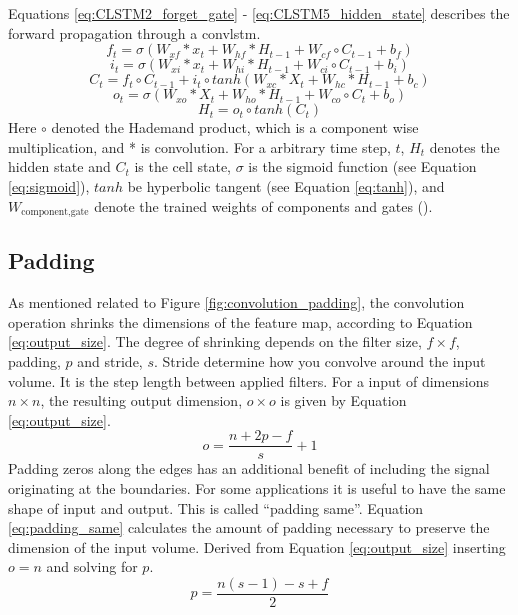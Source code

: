 Equations \eqref{eq:CLSTM2_forget_gate} - \eqref{eq:CLSTM5_hidden_state} describes the forward propagation through a \acrshort{convlstm}. 
\begin{equation} \label{eq:CLSTM2_forget_gate}
        f_t = \sigma \left( W_{xf}*x_t + W_{hf}*H_{t-1} + W_{cf}\circ C_{t-1}+b_f \right)
\end{equation}
\begin{equation} \label{eq:CLSTM1_input_gate}
    i_t = \sigma \left( W_{xi}*x_t + W_{hi}*H_{t-1} + W_{ci}\circ C_{t-1}+b_i \right) 
\end{equation}
\begin{equation} \label{eq:CLSTM3_cellstate}
        C_t = f_t \circ C_{t-1} +i_t\circ tanh\left( W_{xc}*X_t + W_{hc}*H_{t-1} + b_c \right)
\end{equation}
\begin{equation} \label{eq:CLSTM4_output_gate}
        o_t = \sigma \left( W_{xo}*X_t + W_{ho}*H_{t-1} + W_{co}\circ C_{t}+b_o \right)
\end{equation}
\begin{equation} \label{eq:CLSTM5_hidden_state}
        H_t = o_t \circ tanh \left( C_t \right)
\end{equation}
Here $\circ$ denoted the Hademand product, which is a component wise multiplication, and * is convolution. For a arbitrary time step, $t$, $H_{t}$ denotes the hidden state and $C_{t}$ is the cell state, $\sigma$ is the sigmoid function (see Equation \eqref{eq:sigmoid}), $tanh$ be hyperbolic tangent (see Equation \eqref{eq:tanh}), and $W_{\text{component}, \text{gate}}$ denote the trained weights of components and gates (\cite{precip_nowcasting}). 

\subsection{Padding} \label{sec:padding}
As mentioned related to Figure \ref{fig:convolution_padding}, the convolution operation shrinks the dimensions of the feature map, according to Equation \eqref{eq:output_size}. The degree of shrinking depends on the filter size, $f\times f$, padding, $p$ and stride, $s$. Stride determine how you convolve around the input volume. It is the step length between applied filters. For a input of dimensions $n\times n$, the resulting output dimension, $o\times o$ is given by Equation \eqref{eq:output_size}.
\begin{equation} \label{eq:output_size}
    o = \frac{n+2p-f}{s} + 1
\end{equation}
Padding zeros along the edges has an additional benefit of including the signal originating at the boundaries. For some applications it is useful to have the same shape of input and output. This is called ``padding same''. Equation \eqref{eq:padding_same} calculates the amount of padding necessary to preserve the dimension of the input volume. 
Derived from Equation \eqref{eq:output_size} inserting $o=n$ and solving for $p$.
\begin{equation} \label{eq:padding_same}
    p = \frac{n\left(s-1\right)-s+f}{2}
\end{equation}

